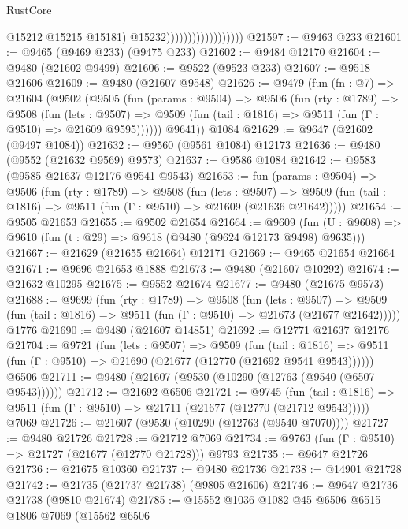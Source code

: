 \begin{lexlean}{RustCore}
\begin{coremodule}
                                          @15212
                                          @15215
                                          @15181)
                                        @15232))))))))))))))))))
@21597 := @9463 @233
@21601 := @9465 (@9469 @233) (@9475 @233)
@21602 := @9484 @12170
@21604 := @9480 (@21602 @9499)
@21606 := @9522 (@9523 @233)
@21607 := @9518 @21606
@21609 := @9480 (@21607 @9548)
@21626 := @9479
    (fun (fn : @7) =>
    @21604
      (@9502
        (@9505
          (fun (params : @9504) =>
          @9506
            (fun (rty : @1789) =>
            @9508
              (fun (lets : @9507) =>
              @9509 (fun (tail : @1816) => @9511 (fun (Γ : @9510) => @21609 @9595))))))
        @9641))
    @1084
@21629 := @9647 (@21602 (@9497 @1084))
@21632 := @9560 (@9561 @1084) @12173
@21636 := @9480 (@9552 (@21632 @9569) @9573)
@21637 := @9586 @1084
@21642 := @9583 (@9585 @21637 @12176 @9541 @9543)
@21653 := fun (params : @9504) =>
  @9506
    (fun (rty : @1789) =>
    @9508
      (fun (lets : @9507) =>
      @9509 (fun (tail : @1816) => @9511 (fun (Γ : @9510) => @21609 (@21636 @21642)))))
@21654 := @9505 @21653
@21655 := @9502 @21654
@21664 := @9609
    (fun (U : @9608) => @9610 (fun (t : @29) => @9618 (@9480 (@9624 @12173 @9498) @9635)))
@21667 := @21629 (@21655 @21664) @12171
@21669 := @9465 @21654 @21664
@21671 := @9696 @21653 @1888
@21673 := @9480 (@21607 @10292)
@21674 := @21632 @10295
@21675 := @9552 @21674
@21677 := @9480 (@21675 @9573)
@21688 := @9699
    (fun (rty : @1789) =>
    @9508
      (fun (lets : @9507) =>
      @9509 (fun (tail : @1816) => @9511 (fun (Γ : @9510) => @21673 (@21677 @21642)))))
    @1776
@21690 := @9480 (@21607 @14851)
@21692 := @12771 @21637 @12176
@21704 := @9721
    (fun (lets : @9507) =>
    @9509
      (fun (tail : @1816) =>
      @9511 (fun (Γ : @9510) => @21690 (@21677 (@12770 (@21692 @9541 @9543))))))
    @6506
@21711 := @9480 (@21607 (@9530 (@10290 (@12763 (@9540 (@6507 @9543))))))
@21712 := @21692 @6506
@21721 := @9745
    (fun (tail : @1816) => @9511 (fun (Γ : @9510) => @21711 (@21677 (@12770 (@21712 @9543)))))
    @7069
@21726 := @21607 (@9530 (@10290 (@12763 (@9540 @7070))))
@21727 := @9480 @21726
@21728 := @21712 @7069
@21734 := @9763 (fun (Γ : @9510) => @21727 (@21677 (@12770 @21728))) @9793
@21735 := @9647 @21726
@21736 := @21675 @10360
@21737 := @9480 @21736
@21738 := @14901 @21728
@21742 := @21735 (@21737 @21738) (@9805 @21606)
@21746 := @9647 @21736 @21738 (@9810 @21674)
@21785 := @15552
    @1036
    @1082
    @45
    @6506
    @6515
    @1806
    @7069
    (@15562
      @6506

\end{coremodule}
\end{lexlean}
